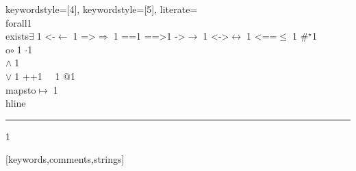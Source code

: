 {    keywordstyle=[4]{\ttfamily\color{dkblue}},
    keywordstyle=[5]{\ttfamily\color{dkred}},
    literate=
    {\\forall}{{\color{dkgreen}{$\forall\;$}}}1
    {\\exists}{{$\exists\;$}}1
    {<-}{{$\leftarrow\;$}}1
    {=>}{{$\Rightarrow\;$}}1
    {==}{{\code{==}\;}}1
    {==>}{{\code{==>}\;}}1
    {->}{{$\rightarrow\;$}}1
    {<->}{{$\leftrightarrow\;$}}1
    {<==}{{$\leq\;$}}1
    {\#}{{$^\star$}}1 
    {\\o}{{$\circ\;$}}1 
    {\@}{{$\cdot$}}1 
    {\/\\}{{$\wedge\;$}}1
    {\\\/}{{$\vee\;$}}1
    {++}{{\code{++}}}1
    {~}{{\ }}1
    {\@\@}{{$@$}}1
    {\\mapsto}{{$\mapsto\;$}}1
    {\\hline}{{\rule{\linewidth}{0.5pt}}}1
}[keywords,comments,strings]


\usepackage{ebproof}
